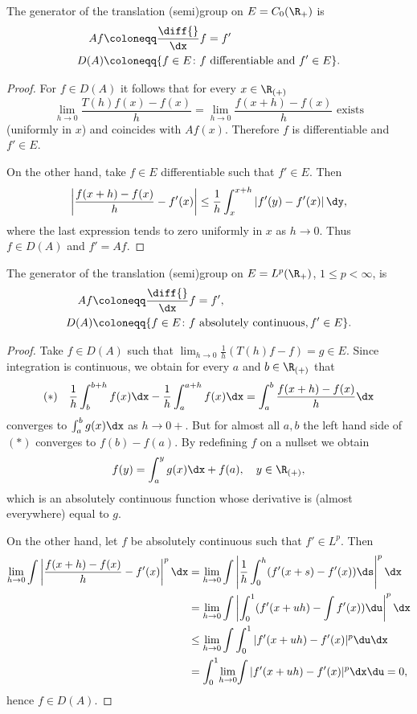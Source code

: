 The generator of the translation (semi)group on $E = C_{0}(\R_{+})$ is 
\begin{align*}
    Af & \coloneqq \frac{\diff{}}{\dx}f = f' \\
    D(A) &\coloneqq \{f \in E \colon f \text{ differentiable and } f' \in E\}.
\end{align*}
\begin{proof}
For $f \in D(A)$ it follows that for every $x \in \R_{(+)}$
\[
    \lim_{h \to 0} \frac{T(h)f(x) - f(x)}{h} = \lim_{h \to 0} \frac{f(x+h) - f(x)}{h} \text{ exists}
\]
(uniformly in $x$) and coincides with $Af(x)$.
Therefore $f$ is differentiable and $f' \in E$.

On the other hand, take $f \in E$ differentiable such that $f' \in E$.
Then
\[
    \left|\frac{f(x+h) - f(x)}{h} - f'(x)\right| \leq \frac{1}{h}\int_{x}^{x+h}|f'(y) - f'(x)|\,\dy,
\]
where the last expression tends to zero uniformly in $x$ as $h \to 0$.
Thus $f \in D(A)$ and $f' = Af$.
\end{proof}
The generator of the translation (semi)group on $E = L^{p}(\R_{+})$, $1 \leq p < \infty$, is
\begin{align*}
    Af &\coloneqq \frac{\diff{}}{\dx}f = f', \\
    D(A) &\coloneqq \{f \in E \colon f \text{ absolutely continuous}, f' \in E\}.
\end{align*}
\begin{proof}
Take $f \in D(A)$ such that $\lim_{h \to 0} \frac{1}{h}(T(h)f - f) = g \in E$.
Since integration is continuous, we obtain for every $a$ and $b \in \R_{(+)}$ that
\begin{equation*}\label{eq:a1-2.1}
(*) \quad \frac{1}{h}\int_{b}^{b+h} f(x) \dx - \frac{1}{h}\int_{a}^{a+h} f(x) \dx = \int_{a}^{b} \frac{f(x+h) - f(x)}{h} \dx
\end{equation*}
converges to $\int_{a}^{b} g(x) \dx$ as $h \to 0+$.
But for almost all $a, b$ the left hand side of\/ $(*)$ converges to $f(b) - f(a)$.
By redefining $f$ on a nullset we obtain
\[
    f(y) = \int_{a}^{y} g(x)\dx + f(a), \quad y \in \R_{(+)},
\]
which is an absolutely continuous function whose derivative is (almost everywhere) equal to $g$.

On the other hand, let $f$ be absolutely continuous such that $f' \in L^{p}$.
Then
\begin{align*}
    \lim_{h \to 0} \int{\left|\frac{f(x+h) - f(x)}{h} - f'(x)\right|^{p} \dx} 
    &= \lim_{h \to 0} \int {\left|\frac{1}{h}\int_{0}^{h} (f'(x+s) - f'(x)) \ds\right|^{p} \dx }\\
    &= \lim_{h \to 0} \int {\left|\int_{0}^{1} (f'(x+uh) -  \int f'(x)) \du\right|^{p} \dx }\\
    &\leq \lim_{h \to 0}{ \int \int_{0}^{1} |f'(x+uh) - f'(x)|^p \du \dx }\\
    & = {\int_{0}^{1}} \displaystyle{\lim_{h \to 0}} {\int|f'(x+uh) - f'(x)|^{p} \dx \du = 0},
\end{align*}
hence $f \in D(A)$.
\end{proof}
